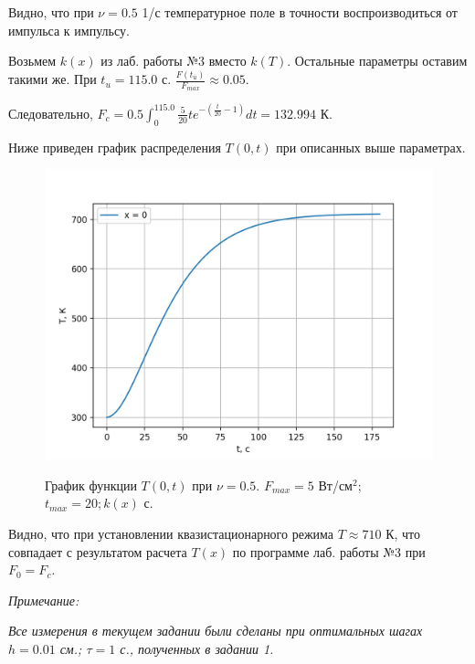 \documentclass[a4paper,12pt]{article}
\begin{document}
	Видно, что при $\nu = 0.5$ 1/с температурное поле в точности воспроизводиться от импульса к импульсу.
	
	
	Возьмем $k(x)$ из лаб. работы №3 вместо $k(T)$. Остальные параметры оставим такими же.
	При $t_u = 115.0$ с. $\frac{F(t_u)}{F_{max}} \approx 0.05$. 
	
	Следовательно, $F_c = 0.5 \int_{0}^{115.0} \frac{5}{20}t e^{- (\frac{t}{20} - 1)}dt = 132.994$ К. 

	\newpage

	Ниже приведен график распределения $T(0, t)$ при описанных выше параметрах.
	
	\begin{figure}[h!]
		\begin{center}
			{\includegraphics[scale = 0.7]{nu=0.5;k(x).png}}
		\end{center}
		\caption{График функции $T(0, t)$ при $\nu=0.5$. $F_{max}=5$ Вт/см$^2$; $t_{max} = 20; k(x)$ с.}
		\label{ris:nu=0.5;k(x)}
	\end{figure}
	
	Видно, что при установлении квазистационарного режима $T \approx 710$ К, что совпадает с результатом расчета $T(x)$ по программе лаб. работы №3 при $F_0 = F_c$.

	\textit{Примечание:}
	
	\textit{Все измерения в текущем задании были сделаны при оптимальных шагах $h = 0.01$ см.; $\tau = 1$ с., полученных в задании 1.}
	
\end{document}
